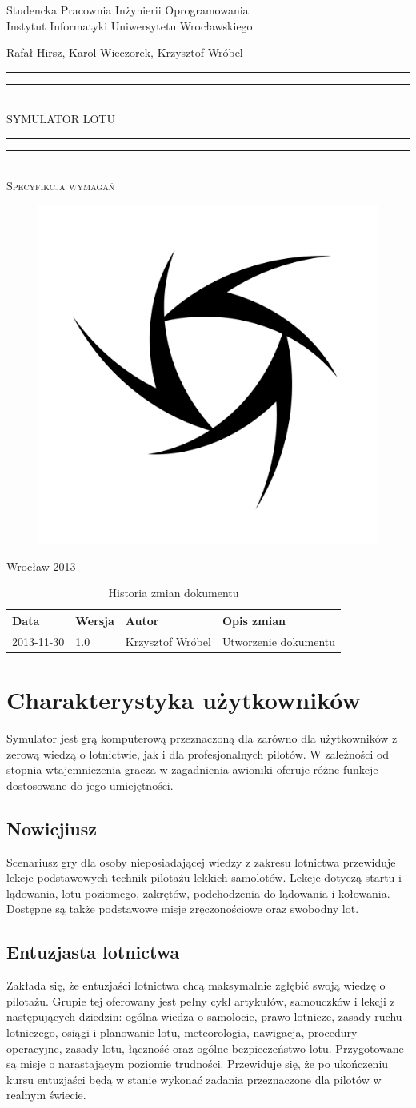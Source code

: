 \documentclass{mwrep}
\newcommand*{\titleGP}{\begingroup
\centering

{\large Studencka Pracownia Inżynierii Oprogramowania}\\Instytut Informatyki Uniwersytetu Wrocławskiego\par
\vspace*{16\baselineskip}

{\Large Rafał Hirsz, Karol Wieczorek, Krzysztof Wróbel\par}
\vspace*{\baselineskip}

\rule{\textwidth}{1.6pt}\vspace*{-\baselineskip}\vspace*{2pt}
\rule{\textwidth}{0.4pt}\\[\baselineskip]

{\Huge SYMULATOR LOTU}\\[0.2\baselineskip]

\rule{\textwidth}{0.4pt}\vspace*{-\baselineskip}\vspace{3.2pt}
\rule{\textwidth}{1.6pt}\\[\baselineskip]

\scshape
{\huge Specyfikcja wymagań}\par
\vspace*{2\baselineskip}

\begin{figure}[h]
\centering
\includegraphics[width=5\baselineskip]{flightsim-team-logo.pdf}
\end{figure}
\vfill

{\large Wrocław 2013}\par

\pagebreak

\endgroup}
\begin{document}
\thispagestyle{empty}
\titleGP

\begin{center}
\begin{table}[h]
\begin{center}
\begin{tabularx}{1\textwidth}{|l|l|l|X|}
\hline
Data & Wersja & Autor & Opis zmian \\ \hline
2013-11-30 & 1.0 & Krzysztof Wróbel & Utworzenie dokumentu \\
\hline
\end{tabularx}
\end{center}
\vspace{3ex}
\caption{Historia zmian dokumentu}\label{T:Zmiany}
\end{table}
\end{center}

\pagebreak

\tableofcontents

\chapter{Charakterystyka użytkowników}

Symulator jest grą komputerową przeznaczoną dla zarówno dla użytkowników z zerową wiedzą o lotnictwie, jak i dla profesjonalnych pilotów. W zależności od stopnia wtajemniczenia gracza w zagadnienia awioniki oferuje różne funkcje dostosowane do jego umiejętności.

\section{Nowicjiusz}

Scenariusz gry dla osoby nieposiadającej wiedzy z zakresu lotnictwa przewiduje lekcje podstawowych technik pilotażu lekkich samolotów. Lekcje dotyczą startu i lądowania, lotu poziomego, zakrętów, podchodzenia do lądowania i kołowania. Dostępne są także podstawowe misje zręczonościowe oraz swobodny lot.

\section{Entuzjasta lotnictwa}

Zakłada się, że entuzjaści lotnictwa chcą maksymalnie zgłębić swoją wiedzę o pilotażu. Grupie tej oferowany jest pełny cykl artykułów, samouczków i lekcji z następujących dziedzin: ogólna wiedza o samolocie, prawo lotnicze, zasady ruchu lotniczego, osiągi i planowanie lotu, meteorologia, nawigacja, procedury operacyjne, zasady lotu, łączność oraz ogólne bezpieczeństwo lotu. Przygotowane są misje o narastającym poziomie trudności. Przewiduje się, że po ukończeniu kursu entuzjaści będą w stanie wykonać zadania przeznaczone dla pilotów w realnym świecie.
\end{document}
